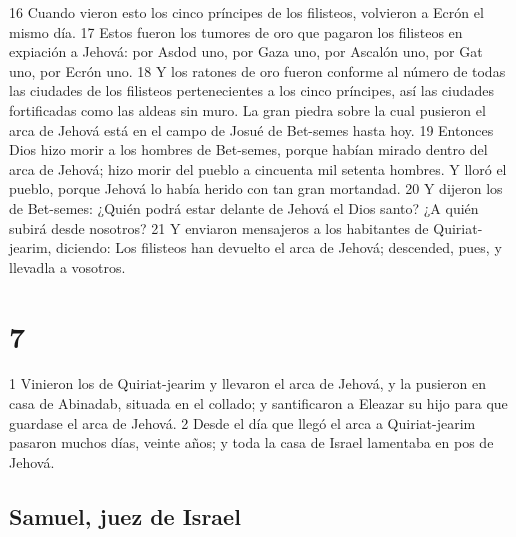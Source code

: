 16 Cuando vieron esto los cinco príncipes de los filisteos, volvieron a Ecrón el mismo día.
17 Estos fueron los tumores de oro que pagaron los filisteos en expiación a Jehová: por Asdod uno, por Gaza uno, por Ascalón uno, por Gat uno, por Ecrón uno.
18 Y los ratones de oro fueron conforme al número de todas las ciudades de los filisteos pertenecientes a los cinco príncipes, así las ciudades fortificadas como las aldeas sin muro. La gran piedra sobre la cual pusieron el arca de Jehová está en el campo de Josué de Bet-semes hasta hoy.
19 Entonces Dios hizo morir a los hombres de Bet-semes, porque habían mirado dentro del arca de Jehová; hizo morir del pueblo a cincuenta mil setenta hombres. Y lloró el pueblo, porque Jehová lo había herido con tan gran mortandad.
20 Y dijeron los de Bet-semes: ¿Quién podrá estar delante de Jehová el Dios santo? ¿A quién subirá desde nosotros?
21 Y enviaron mensajeros a los habitantes de Quiriat-jearim, diciendo: Los filisteos han devuelto el arca de Jehová; descended, pues, y llevadla a vosotros.

\chapter{7}

1 Vinieron los de Quiriat-jearim y llevaron el arca de Jehová, y la pusieron en casa de Abinadab, situada en el collado; y santificaron a Eleazar su hijo para que guardase el arca de Jehová. 
2 Desde el día que llegó el arca a Quiriat-jearim pasaron muchos días, veinte años; y toda la casa de Israel lamentaba en pos de Jehová.

\section*{Samuel, juez de Israel }

